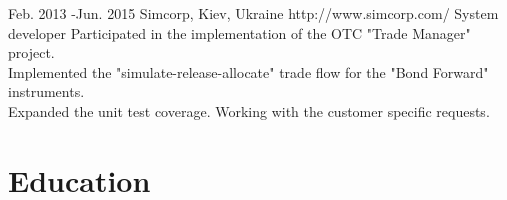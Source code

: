 \documentclass[10pt]{article} %
\begin{document}
\job
{Feb. 2013 -}{Jun. 2015}
{Simcorp, Kiev, Ukraine}
{http://www.simcorp.com/}
{System developer}
{Participated in the implementation of the OTC "Trade Manager" project. 
\\Implemented the "simulate-release-allocate" trade flow for the "Bond Forward" instruments. 
\\Expanded the unit test coverage. Working with the customer specific requests. \\
 }


\section{Education}

\end{document}

